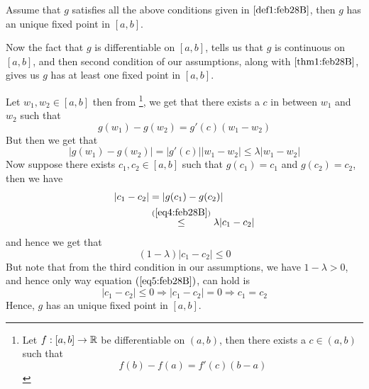 \begin{thm}\label{thm2:feb28B}
    Assume that $g$ satisfies all the above conditions given in  $\ref{def1:feb28B}$, then $g$ has an unique fixed point in $[a,b]$.
\end{thm}
\begin{prf}
    Now the fact that $g$ is differentiable on $[a,b]$, tells us that $g$ is continuous on $[a,b]$, and then second condition of our assumptions, along with  $\ref{thm1:feb28B}$, gives us $g$ has at least one fixed point in $[a,b]$.     

    Let $w_1, w_2 \in [a,b]$ then from \footnote[1]{ Let $f : [a,b] \to \mathbb{R}$ be differentiable on $(a,b)$, then there exists a $c \in (a,b)$ such that \[ f(b)-f(a) = f'(c) (b-a) \] }, we get that there exists a $c$ in between $w_1$ and $w_2$ such that 
    \[
        g(w_1) - g(w_2) = g'(c) (w_1 - w_2)     
    \]
    But then we get that 
    \begin{equation}\label{eq4:feb28B}
        |g(w_1) - g(w_2)| = |g'(c)| |w_1 - w_2| \leq \lambda |w_1 - w_2|
    \end{equation}
    Now suppose there exists $c_1, c_2 \in [a,b]$ such that $g(c_1) = c_1$ and $g(c_2) = c_2$, then we have 
    \begin{align*}
        |c_1 - c_2| &= |g(c_1) - g(c_2)| \\ 
                    &\overset{(\ref{eq4:feb28B})}{\leq} \lambda |c_1 - c_2|
    \end{align*}
    and hence we get that
    \begin{equation}\label{eq5:feb28B}
        (1-\lambda)|c_1 - c_2| \leq 0        
    \end{equation} 
    But note that from the third condition in our assumptions, we have $1 -\lambda > 0$, and hence only way equation $(\ref{eq5:feb28B})$, can hold is 
    \[
        |c_1 - c_2| \leq 0 \Rightarrow |c_1 - c_2| = 0 \Rightarrow c_1 = c_2  
    \]
    Hence, $g$ has an unique fixed point in $[a,b]$.
\end{prf}